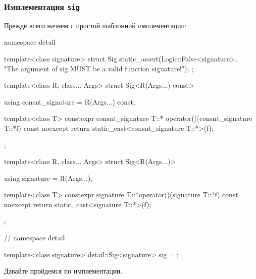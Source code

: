 \subsubsection{Имплементация \texttt{sig}}
\label{section::Sig}

Прежде всего начнем с простой шаблонной имплементации:
\begin{cppcode}
namespace detail {
template<class signature>
struct Sig {
  static_assert(Logic::False<signature>,
                "The argument of sig MUST be a valid function signature!");
};

template<class R, class... Args>
struct Sig<R(Args...) const> {
  using consnt_signature = R(Args...) const;

  template<class T>
  constexpr consnt_signature T::*
  operator()(consnt_signature T::*f) const noexcept {
    return static_cast<consnt_signature T::*>(f);
  }
};

template<class R, class... Args>
struct Sig<R(Args...)> {
  using signature = R(Args...);

  template<class T>
  constexpr signature T::*operator()(signature T::*f) const noexcept {
    return static_cast<signature T::*>(f);
  }
};
} // namespace detail

template<class signature>
detail::Sig<signature> sig = {};
\end{cppcode}
Давайте пройдемся по имплементации.
